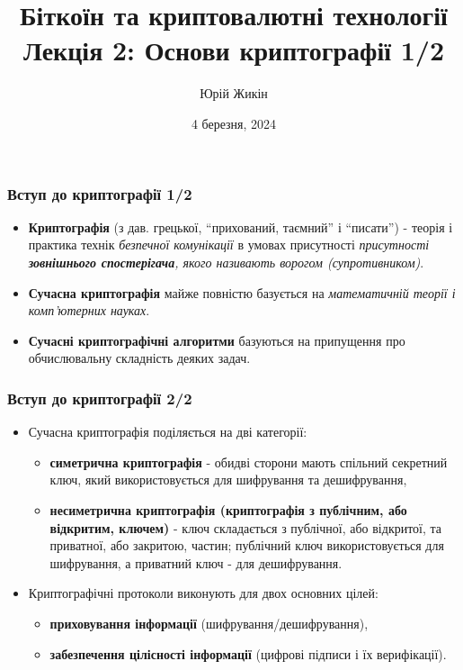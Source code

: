 \documentclass{beamer}
\title{
  Біткоїн та криптовалютні технології \\
  Лекція 2: Основи криптографії 1/2
}
\author{Юрій Жикін}
\date{4 березня, 2024}
\begin{document}
\frame{\titlepage}

\begin{frame}
  \frametitle{Вступ до криптографії 1/2}
  \begin{itemize}
  \item \textbf{Криптографія} (з дав. грецької, ``прихований, таємний'' і
    ``писати'') - теорія і практика технік \textit{безпечної комунікації} в
    умовах присутності \textit{присутності \textbf{зовнішнього спостерігача},
      якого називають ворогом (супротивником)}.
  \item \textbf{Сучасна криптографія} майже повністю базується на
    \textit{математичній теорії і комп'ютерних науках}.
  \item \textbf{Сучасні криптографічні алгоритми} базуються на припущення про
    обчислювальну складність деяких задач.
  \end{itemize}
\end{frame}

\begin{frame}
  \frametitle{Вступ до криптографії 2/2}
  \begin{itemize}
  \item Сучасна криптографія поділяється на дві категорії:
    \begin{itemize}
    \item \textbf{симетрична криптографія} - обидві сторони мають спільний
      секретний ключ, який використовується для шифрування та дешифрування,
    \item \textbf{несиметрична криптографія (криптографія з публічним, або
        відкритим, ключем)} - ключ складається з публічної, або відкритої, та
      приватної, або закритою, частин; публічний ключ використовується для
      шифрування, а приватний ключ - для дешифрування.
    \end{itemize}
  \item Криптографічні протоколи виконують для двох основних цілей:
    \begin{itemize}
    \item \textbf{приховування інформації} (шифрування/дешифрування),
    \item \textbf{забезпечення цілісності інформації} (цифрові підписи і їх
      верифікації).
    \end{itemize}
  \end{itemize}
\end{frame}
\end{document}
